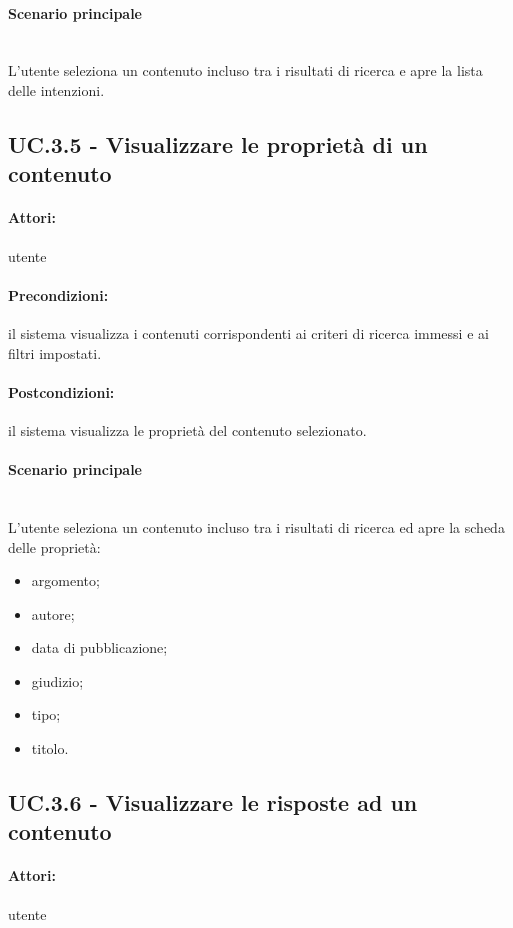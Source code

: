 \documentclass[10pt,a4paper,headinclude,footinclude,hidelinks]{scrreprt} %
\begin{document}
	\paragraph{Scenario principale} \hfill \\
	L'utente seleziona un contenuto incluso tra i risultati di ricerca e apre la lista delle intenzioni.

	\subsection[UC.3.5]{UC.3.5 - Visualizzare le proprietà di un contenuto}
	\label{sec:stage:ar:uc:3_5}
	\paragraph{Attori:} utente
	\paragraph{Precondizioni:} il sistema visualizza i contenuti corrispondenti ai criteri di ricerca immessi e ai filtri impostati.
	\paragraph{Postcondizioni:} il sistema visualizza le proprietà del contenuto selezionato. 
	\paragraph{Scenario principale} \hfill \\
	L'utente seleziona un contenuto incluso tra i risultati di ricerca ed apre la scheda delle proprietà:
	\begin{itemize}
	\item argomento;
	\item autore;
	\item data di pubblicazione;
	\item giudizio;
	\item tipo;
	\item titolo.
	\end{itemize}

	\subsection[UC.3.6]{UC.3.6 - Visualizzare le risposte ad un contenuto}
	\label{sec:stage:ar:uc:3_6}
	\paragraph{Attori:} utente
\end{document}
